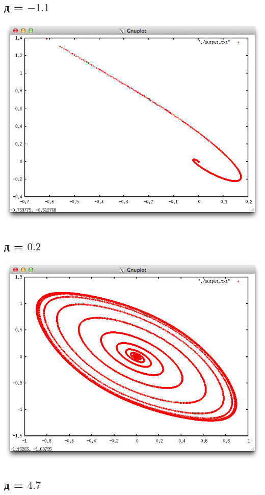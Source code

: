 \documentclass[12pt,a4paper]{article}
\begin{document}
\subsection{д = $-1.1$}

\includegraphics[scale=0.5]{first}

\subsection{д = $0.2$}

\includegraphics[scale=0.5]{second}

\subsection{д = $4.7$}
\end{document}
